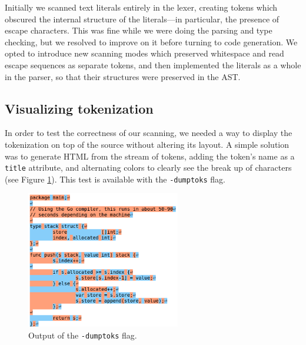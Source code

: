 \documentclass[oneside]{article}
\begin{document}
Initially we scanned text literals entirely in the lexer, creating tokens which obscured the internal structure of the literals---in particular, the presence of escape characters. This was fine while we were doing the parsing and type checking, but we resolved to improve on it before turning to code generation. We opted to introduce new scanning modes which preserved whitespace and read escape sequences as separate tokens, and then implemented the literals as a whole in the parser, so that their structures were preserved in the AST.

\subsection{Visualizing tokenization}
In order to test the correctness of our scanning, we needed a way to display the tokenization on top of the source without altering its layout. A simple solution was to generate HTML from the stream of tokens, adding the token's name as a \verb|title| attribute, and alternating colors to clearly see the break up of characters (see Figure \ref{fig:screen_dumptoks}). This test is available with the \verb|-dumptoks| flag.

\begin{figure}
	\centering
    \includegraphics[width=0.6\textwidth]{screen_dumptoks}
    \caption{Output of the \texttt{-dumptoks} flag.}
    \label{fig:screen_dumptoks}
\end{figure}
\end{document}
